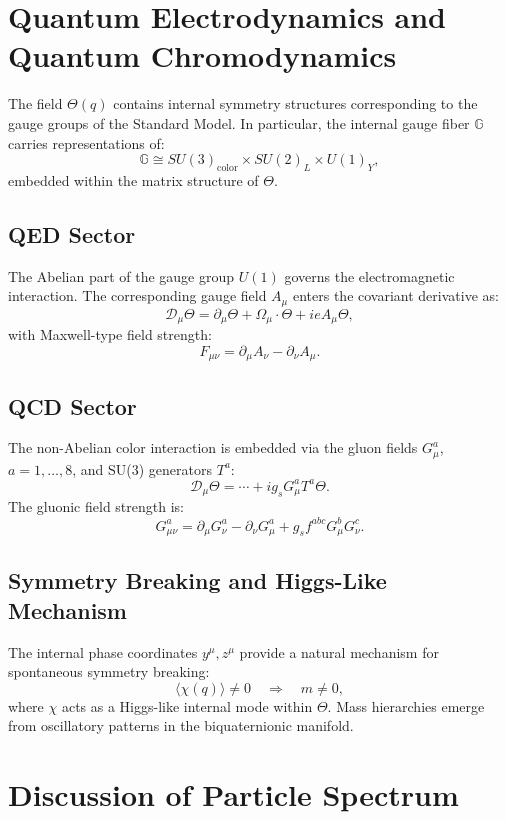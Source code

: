 \documentclass[12pt]{article}
\begin{document}
\section{Quantum Electrodynamics and Quantum Chromodynamics}

The field \( \Theta(q) \) contains internal symmetry structures corresponding to the gauge groups of the Standard Model. In particular, the internal gauge fiber \( \mathbb{G} \) carries representations of:
\[
\mathbb{G} \cong SU(3)_\text{color} \times SU(2)_L \times U(1)_Y,
\]
embedded within the matrix structure of \( \Theta \).

\subsection{QED Sector}

The Abelian part of the gauge group \( U(1) \) governs the electromagnetic interaction. The corresponding gauge field \( A_\mu \) enters the covariant derivative as:
\[
\mathcal{D}_\mu \Theta = \partial_\mu \Theta + \Omega_\mu \cdot \Theta + i e A_\mu \Theta,
\]
with Maxwell-type field strength:
\[
F_{\mu\nu} = \partial_\mu A_\nu - \partial_\nu A_\mu.
\]

\subsection{QCD Sector}

The non-Abelian color interaction is embedded via the gluon fields \( G_\mu^a \), \( a=1,\dots,8 \), and SU(3) generators \( T^a \):
\[
\mathcal{D}_\mu \Theta = \cdots + i g_s G_\mu^a T^a \Theta.
\]
The gluonic field strength is:
\[
G_{\mu\nu}^a = \partial_\mu G_\nu^a - \partial_\nu G_\mu^a + g_s f^{abc} G_\mu^b G_\nu^c.
\]

\subsection{Symmetry Breaking and Higgs-Like Mechanism}

The internal phase coordinates \( y^\mu, z^\mu \) provide a natural mechanism for spontaneous symmetry breaking:
\[
\langle \chi(q) \rangle \neq 0 \quad \Rightarrow \quad m \neq 0,
\]
where \( \chi \) acts as a Higgs-like internal mode within \( \Theta \). Mass hierarchies emerge from oscillatory patterns in the biquaternionic manifold.

\section{Discussion of Particle Spectrum}
\end{document}

